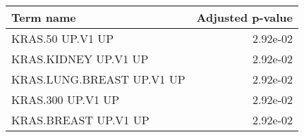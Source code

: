 \begin{tabular}{lr}
\toprule
                Term name &  Adjusted p-value \\
\midrule
         KRAS.50 UP.V1 UP &          2.92e-02 \\
     KRAS.KIDNEY UP.V1 UP &          2.92e-02 \\
KRAS.LUNG.BREAST UP.V1 UP &          2.92e-02 \\
        KRAS.300 UP.V1 UP &          2.92e-02 \\
     KRAS.BREAST UP.V1 UP &          2.92e-02 \\
\bottomrule
\end{tabular}
